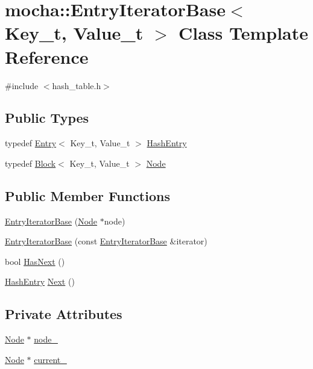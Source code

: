\hypertarget{classmocha_1_1_entry_iterator_base}{
\section{mocha::EntryIteratorBase$<$ Key\_\-t, Value\_\-t $>$ Class Template Reference}
\label{classmocha_1_1_entry_iterator_base}
}


{\ttfamily \#include $<$hash\_\-table.h$>$}

\subsection*{Public Types}
\begin{DoxyCompactItemize}
\item 
typedef \hyperlink{classmocha_1_1_entry}{Entry}$<$ Key\_\-t, Value\_\-t $>$ \hyperlink{classmocha_1_1_entry_iterator_base_a8bc02c1067df11a391cf565953e23b05}{HashEntry}
\item 
typedef \hyperlink{classmocha_1_1_block}{Block}$<$ Key\_\-t, Value\_\-t $>$ \hyperlink{classmocha_1_1_entry_iterator_base_a0c7fd5003d4f45319346ae64e6e111be}{Node}
\end{DoxyCompactItemize}
\subsection*{Public Member Functions}
\begin{DoxyCompactItemize}
\item 
\hyperlink{classmocha_1_1_entry_iterator_base_a22f7638410ddf78c3cbd778087bb03b5}{EntryIteratorBase} (\hyperlink{classmocha_1_1_block}{Node} $\ast$node)
\item 
\hyperlink{classmocha_1_1_entry_iterator_base_a87b0daed5edb1f08879329571ee424c0}{EntryIteratorBase} (const \hyperlink{classmocha_1_1_entry_iterator_base}{EntryIteratorBase} \&iterator)
\item 
bool \hyperlink{classmocha_1_1_entry_iterator_base_a44e67289c205d7f758f07eaf8f8dc154}{HasNext} ()
\item 
\hyperlink{classmocha_1_1_entry}{HashEntry} \hyperlink{classmocha_1_1_entry_iterator_base_ab9cb9d8f5c9e2b59243de6e2c6028146}{Next} ()
\end{DoxyCompactItemize}
\subsection*{Private Attributes}
\begin{DoxyCompactItemize}
\item 
\hyperlink{classmocha_1_1_block}{Node} $\ast$ \hyperlink{classmocha_1_1_entry_iterator_base_a6cd7e41a0a9e198c6ef5bcf745f0a89a}{node\_\-}
\item 
\hyperlink{classmocha_1_1_block}{Node} $\ast$ \hyperlink{classmocha_1_1_entry_iterator_base_aa7d56c6b85e161cd052317a225e5b550}{current\_\-}
\end{DoxyCompactItemize}


